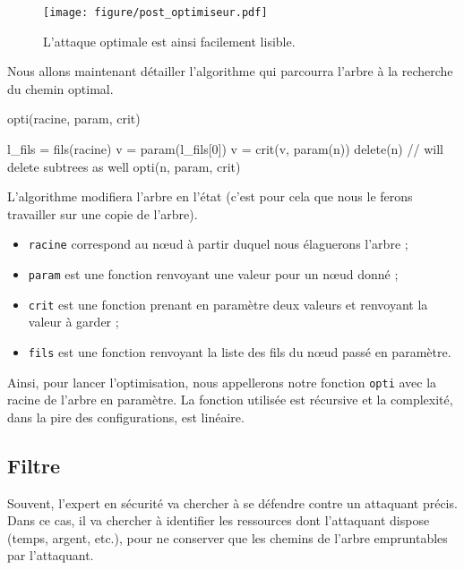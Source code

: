 		\begin{figure}[h!]
			\centering
			\texttt{[image: figure/post\_optimiseur.pdf]}
			\caption{L'attaque optimale est ainsi facilement lisible.}
			\label{fig:arbre_post_opti}
		\end{figure}
	
		Nous allons maintenant détailler l'algorithme qui parcourra l'arbre à la recherche du chemin optimal.
		\begin{algorithm}[h!]
			\caption{opti(racine, param, crit)}
			\begin{algorithmic}
				\STATE l\_fils = fils(racine)
					\RETURN
				\ENDIF
					\STATE v = param(l\_fils[0])
						\STATE v = crit(v, param(n))
					\ENDFOR
							\STATE delete(n) // will delete subtrees as well
						\ENDIF
					\ENDFOR
				\ENDIF
					\STATE opti(n, param, crit)
				\ENDFOR
			\end{algorithmic}
		\end{algorithm}

		L'algorithme modifiera l'arbre en l'état (c'est pour cela que nous le ferons travailler sur une copie de l'arbre).
		\begin{itemize}
			\item \verb|racine| correspond au nœud à partir duquel nous élaguerons l'arbre ;
			\item \verb|param| est une fonction renvoyant une valeur pour un nœud donné ;
			\item \verb|crit| est une fonction prenant en paramètre deux valeurs et renvoyant la valeur à \og garder \fg{} ;
			\item \verb|fils| est une fonction renvoyant la liste des fils du nœud passé en paramètre.
		\end{itemize}

		Ainsi, pour lancer l'optimisation, nous appellerons notre fonction \verb|opti| avec la racine de l'arbre en paramètre. La fonction utilisée est récursive et la complexité, dans la pire des configurations, est linéaire.

	\subsection{Filtre}
		\label{subsection:filtre} 

		Souvent, l'expert en sécurité va chercher à se défendre contre un attaquant précis. Dans ce cas, il va chercher à identifier les ressources dont l'attaquant dispose (temps, argent, etc.), pour ne conserver que les chemins de l'arbre empruntables par l'attaquant.

